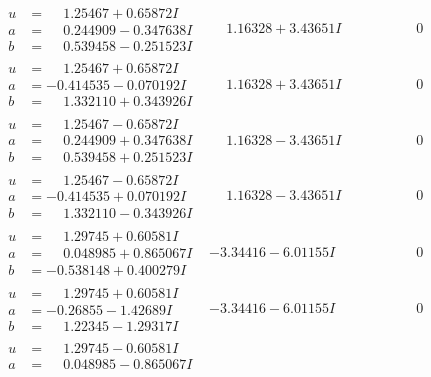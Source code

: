 \documentclass[1p]{elsarticle_modified}
\theoremstyle{definition}
\begin{document}
$$\begin{array}{c|c|c}
 \hline 
\begin{aligned}
u &= \phantom{-}1.25467 + 0.65872 I \\
a &= \phantom{-}0.244909 - 0.347638 I \\
b &= \phantom{-}0.539458 - 0.251523 I\end{aligned}
 & \phantom{-}1.16328 + 3.43651 I & \phantom{-0.000000 } 0 \\ \hline\begin{aligned}
u &= \phantom{-}1.25467 + 0.65872 I \\
a &= -0.414535 - 0.070192 I \\
b &= \phantom{-}1.332110 + 0.343926 I\end{aligned}
 & \phantom{-}1.16328 + 3.43651 I & \phantom{-0.000000 } 0 \\ \hline\begin{aligned}
u &= \phantom{-}1.25467 - 0.65872 I \\
a &= \phantom{-}0.244909 + 0.347638 I \\
b &= \phantom{-}0.539458 + 0.251523 I\end{aligned}
 & \phantom{-}1.16328 - 3.43651 I & \phantom{-0.000000 } 0 \\ \hline\begin{aligned}
u &= \phantom{-}1.25467 - 0.65872 I \\
a &= -0.414535 + 0.070192 I \\
b &= \phantom{-}1.332110 - 0.343926 I\end{aligned}
 & \phantom{-}1.16328 - 3.43651 I & \phantom{-0.000000 } 0 \\ \hline\begin{aligned}
u &= \phantom{-}1.29745 + 0.60581 I \\
a &= \phantom{-}0.048985 + 0.865067 I \\
b &= -0.538148 + 0.400279 I\end{aligned}
 & -3.34416 - 6.01155 I & \phantom{-0.000000 } 0 \\ \hline\begin{aligned}
u &= \phantom{-}1.29745 + 0.60581 I \\
a &= -0.26855 - 1.42689 I \\
b &= \phantom{-}1.22345 - 1.29317 I\end{aligned}
 & -3.34416 - 6.01155 I & \phantom{-0.000000 } 0 \\ \hline\begin{aligned}
u &= \phantom{-}1.29745 - 0.60581 I \\
a &= \phantom{-}0.048985 - 0.865067 I \\

\end{aligned}
\end{array}$$
\end{document}
